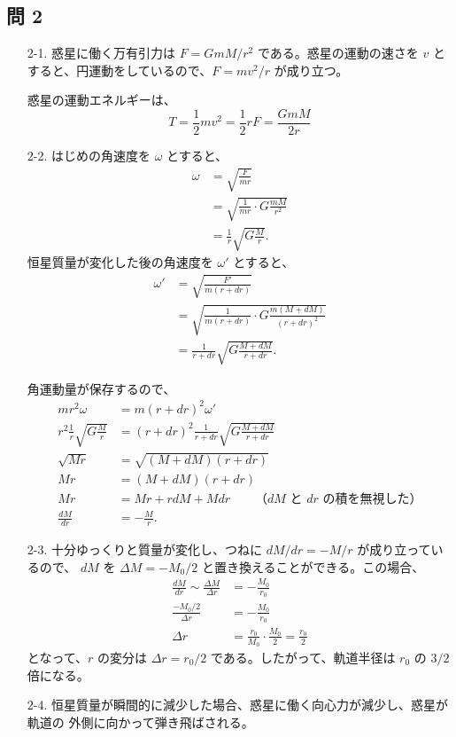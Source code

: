\documentclass[report]{dennou777}
\begin{document}
\subsection{問 2}
\begin{itemize}
	\item[2-1.]
		惑星に働く万有引力は $F=GmM/r^2$ である。惑星の運動の速さを $v$ と
		すると、円運動をしているので、$F=mv^2/r$ が成り立つ。

		惑星の運動エネルギーは、
		\[T=\frac{1}{2}mv^2=\frac{1}{2}rF=\frac{GmM}{2r}\]
	\item[2-2.]
		はじめの角速度を $\omega$ とすると、
		\begin{align*}
			\omega&=\sqrt{\frac{F}{mr}}\\
			&=\sqrt{\frac{1}{mr}\cdot G\frac{mM}{r^2}}\\
			&=\frac{1}{r}\sqrt{G\frac{M}{r}}.
		\end{align*}
		恒星質量が変化した後の角速度を $\omega'$ とすると、
		\begin{align*}
			\omega'&=\sqrt{\frac{F'}{m(r+dr)}}\\
			&=\sqrt{\frac{1}{m(r+dr)}\cdot G\frac{m(M+dM)}{(r+dr)^2}}\\
			&=\frac{1}{r+dr}\sqrt{G\frac{M+dM}{r+dr}}.
		\end{align*}
	
		角運動量が保存するので、
		\begin{align*}
			mr^2\omega&=m(r+dr)^2\omega'\\
			r^2\frac{1}{r}\sqrt{G\frac{M}{r}}&=(r+dr)^2\frac{1}{r+dr}\sqrt{G\frac{M+dM}{r+dr}}\\
			\sqrt{Mr}&=\sqrt{(M+dM)(r+dr)}\\
			Mr&=(M+dM)(r+dr)\\
			Mr&=Mr+rdM+Mdr\qquad\text{（$dM$ と $dr$ の積を無視した）}\\
			\frac{dM}{dr}&=-\frac{M}{r}.
		\end{align*}
	\item[2-3.]
		十分ゆっくりと質量が変化し、つねに $dM/dr=-M/r$ が成り立っているので、
		$dM$ を $\Delta M=-M_0/2$ と置き換えることができる。この場合、
		\begin{align*}
			\frac{dM}{dr}\sim\frac{\Delta M}{\Delta r}&=-\frac{M_0}{r_0}\\
			\frac{-M_0/2}{\Delta r}&=-\frac{M_0}{r_0}\\
			\Delta r&=\frac{r_0}{M_0}\cdot\frac{M_0}{2}=\frac{r_0}{2}
		\end{align*}
		となって、$r$ の変分は $\Delta r=r_0/2$ である。したがって、軌道半径は
		$r_0$ の $3/2$ 倍になる。
	\item[2-4.]
		恒星質量が瞬間的に減少した場合、惑星に働く向心力が減少し、惑星が軌道の
		外側に向かって弾き飛ばされる。
\end{itemize}
\end{document}
